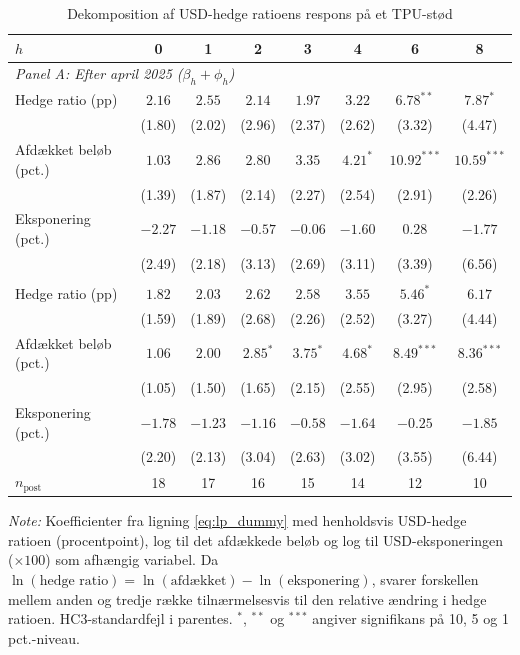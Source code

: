 \begin{table}[H]
\centering
\caption{Dekomposition af USD-hedge ratioens respons på et TPU-stød}
\label{tab:dekomp}
\begin{threeparttable}
\begin{tabular}{lccccccc}
\toprule
$h$ & 0 & 1 & 2 & 3 & 4 & 6 & 8 \\
\midrule
\multicolumn{8}{l}{\textit{Panel A: Efter april 2025 ($\beta_h+\phi_h$)}} \\
Hedge ratio (pp) & $2.16$ & $2.55$ & $2.14$ & $1.97$ & $3.22$ & $6.78^{**}$ & $7.87^{*}$ \\
 & (1.80) & (2.02) & (2.96) & (2.37) & (2.62) & (3.32) & (4.47) \\
Afdækket beløb (pct.) & $1.03$ & $2.86$ & $2.80$ & $3.35$ & $4.21^{*}$ & $10.92^{***}$ & $10.59^{***}$ \\
 & (1.39) & (1.87) & (2.14) & (2.27) & (2.54) & (2.91) & (2.26) \\
Eksponering (pct.) & $-2.27$ & $-1.18$ & $-0.57$ & $-0.06$ & $-1.60$ & $0.28$ & $-1.77$ \\
 & (2.49) & (2.18) & (3.13) & (2.69) & (3.11) & (3.39) & (6.56) \\
\addlinespace
\multicolumn{8}{l}{\textit{Panel B: Forskel ($\phi_h$)}} \\
Hedge ratio (pp) & $1.82$ & $2.03$ & $2.62$ & $2.58$ & $3.55$ & $5.46^{*}$ & $6.17$ \\
 & (1.59) & (1.89) & (2.68) & (2.26) & (2.52) & (3.27) & (4.44) \\
Afdækket beløb (pct.) & $1.06$ & $2.00$ & $2.85^{*}$ & $3.75^{*}$ & $4.68^{*}$ & $8.49^{***}$ & $8.36^{***}$ \\
 & (1.05) & (1.50) & (1.65) & (2.15) & (2.55) & (2.95) & (2.58) \\
Eksponering (pct.) & $-1.78$ & $-1.23$ & $-1.16$ & $-0.58$ & $-1.64$ & $-0.25$ & $-1.85$ \\
 & (2.20) & (2.13) & (3.04) & (2.63) & (3.02) & (3.55) & (6.44) \\
\midrule
$n_{\text{post}}$ & 18 & 17 & 16 & 15 & 14 & 12 & 10 \\
\bottomrule
\end{tabular}
\begin{tablenotes}\footnotesize
\item \textit{Note:} Koefficienter fra ligning \eqref{eq:lp_dummy} med henholdsvis USD-hedge ratioen (procentpoint), log til det afdækkede beløb og log til USD-eksponeringen ($\times 100$) som afhængig variabel. Da $\ln(\text{hedge ratio}) = \ln(\text{afdækket}) - \ln(\text{eksponering})$, svarer forskellen mellem anden og tredje række tilnærmelsesvis til den relative ændring i hedge ratioen. HC3-standardfejl i parentes. $^{*}$, $^{**}$ og $^{***}$ angiver signifikans på 10, 5 og 1 pct.-niveau.
\end{tablenotes}
\end{threeparttable}
\end{table}